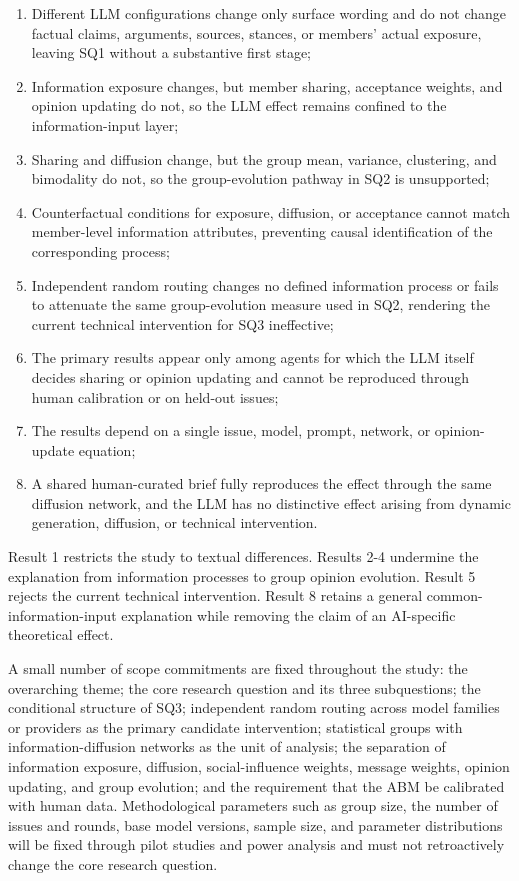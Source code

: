 \documentclass[11pt,a4paper]{article}
\begin{document}
\begin{enumerate}
\item Different LLM configurations change only surface wording and do not change factual claims, arguments, sources, stances, or members' actual exposure, leaving SQ1 without a substantive first stage;
\item Information exposure changes, but member sharing, acceptance weights, and opinion updating do not, so the LLM effect remains confined to the information-input layer;
\item Sharing and diffusion change, but the group mean, variance, clustering, and bimodality do not, so the group-evolution pathway in SQ2 is unsupported;
\item Counterfactual conditions for exposure, diffusion, or acceptance cannot match member-level information attributes, preventing causal identification of the corresponding process;
\item Independent random routing changes no defined information process or fails to attenuate the same group-evolution measure used in SQ2, rendering the current technical intervention for SQ3 ineffective;
\item The primary results appear only among agents for which the LLM itself decides sharing or opinion updating and cannot be reproduced through human calibration or on held-out issues;
\item The results depend on a single issue, model, prompt, network, or opinion-update equation;
\item A shared human-curated brief fully reproduces the effect through the same diffusion network, and the LLM has no distinctive effect arising from dynamic generation, diffusion, or technical intervention.
\end{enumerate}

Result 1 restricts the study to textual differences. Results 2-4 undermine the explanation from information processes to group opinion evolution. Result 5 rejects the current technical intervention. Result 8 retains a general common-information-input explanation while removing the claim of an AI-specific theoretical effect.

A small number of scope commitments are fixed throughout the study: the overarching theme; the core research question and its three subquestions; the conditional structure of SQ3; independent random routing across model families or providers as the primary candidate intervention; statistical groups with information-diffusion networks as the unit of analysis; the separation of information exposure, diffusion, social-influence weights, message weights, opinion updating, and group evolution; and the requirement that the ABM be calibrated with human data. Methodological parameters such as group size, the number of issues and rounds, base model versions, sample size, and parameter distributions will be fixed through pilot studies and power analysis and must not retroactively change the core research question.
\end{document}
